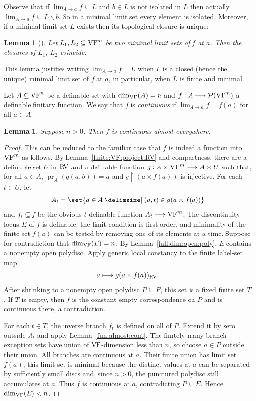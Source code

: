 \documentclass[12pt]{amsart}
\newcommand{\memph}[1]{{\color{magenta}\emph{#1}}}
\theoremstyle{plain}
\newtheorem{lem}[thm]{Lemma}
\theoremstyle{definition}
\theoremstyle{remark}
\numberwithin{equation}{section}
\theoremstyle{plain}
\newcommand{\VF}{\textup{VF}}
\newcommand{\RV}{\textup{RV}}
\DeclareMathOperator{\pr}{pr}
\newcommand{\0}{\emptyset}
\newcommand{\mdl}[1]{\mathcal{#1}}  %
\newcommand{\rest}{\upharpoonright}
\newcommand{\fun}{\longrightarrow}
\newcommand{\efun}{\longmapsto}
\newcommand{\sub}{\subseteq}
\newcommand{\mi}{\smallsetminus}
\providecommand\given{}
\newcommand\SetSymbol[1][]{%
\nonscript \: #1 \vert
\allowbreak
\nonscript\:
\mathopen{}}
\renewcommand\given{\SetSymbol[\delimsize]}
\begin{document}
Observe that if $\lim_{A \rightarrow a} f \sub L$ and $b \in L$ is not isolated in $L$ then actually $\lim_{ A \rightarrow  a} f \sub L \mi b$. So in a minimal limit set every element is isolated. Moreover, if a minimal limit set $L$ exists then its topological closure is unique:

\begin{lem}[{\cite[Lemma~9.2]{Yin:special:trans}}]
Let $L_1, L_2 \sub \VF^m$ be two minimal limit sets of $f$ at $a$. Then the closures of $L_1$, $L_2$ coincide.
\end{lem}


This lemma justifies writing $\lim_{ A \rightarrow a} f = L$ when $L$ is a closed (hence the unique) minimal limit set of $f$ at $a$, in particular, when $L$ is finite and minimal.

Let $A \sub \VF^n$ be a definable set with $\dim_{\VF}(A) = n$ and $f : A \fun \mdl P(\VF^m)$ a definable finitary function. We say that $f$ is \memph{continuous} if $\lim_{ A \rightarrow a} f = f(a)$ for all $a \in A$.

\begin{lem}\label{fini:conti}
Suppose $n>0$. Then $f$ is continuous almost everywhere.
\end{lem}
\begin{proof}
This can be reduced to the familiar case that $f$ is indeed a function into $\VF^m$ as follows. By Lemma~\ref{finite:VF:project:RV} and compactness, there are a definable set $U$ in $\RV$ and a definable function $g: A \times \VF^m \fun A \times U$ such that, for all $a \in A$, $\pr_A(g(a, b)) = a$  and $g \rest (a \times f(a))$ is injective. For each $t \in U$, let
\[
A_t = \set{a \in A \given (a,t) \in g(a \times f(a))}
\]
and $f_t \sub f$ be the obvious $t$-definable function $A_t \fun \VF^m$. The discontinuity locus $E$ of $f$ is definable: the limit condition is first-order, and minimality of the finite set $f(a)$ can be tested by removing one of its elements at a time. Suppose for contradiction that $\dim_{\VF}(E)=n$. By Lemma~\ref{full:dim:open:poly}, $E$ contains a nonempty open polydisc. Apply generic local constancy \cite[Lemma~8.9]{Yin:special:trans} to the finite label-set map
\[
a\efun g(a\times f(a))_{\RV}.
\]
After shrinking to a nonempty open polydisc $P\sub E$, this set is a fixed finite set $T$. If $T$ is empty, then $f$ is the constant empty correspondence on $P$ and is continuous there, a contradiction.

For each $t\in T$, the inverse branch $f_t$ is defined on all of $P$. Extend it by zero outside $A_t$ and apply Lemma~\ref{fun:almost:cont}. The finitely many branch-exception sets have union of $\VF$-dimension less than $n$, so choose $a\in P$ outside their union. All branches are continuous at $a$. Their finite union has limit set $f(a)$; this limit set is minimal because the distinct values at $a$ can be separated by sufficiently small discs and, since $n>0$, the punctured polydisc still accumulates at $a$. Thus $f$ is continuous at $a$, contradicting $P\sub E$. Hence $\dim_{\VF}(E)<n$.
\end{proof}
\end{document}
